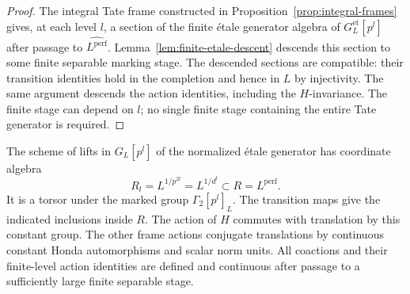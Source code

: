 \begin{proof}
The integral Tate frame constructed in
Proposition~\ref{prop:integral-frames} gives, at each level $l$,
a section of the finite étale generator algebra of
$G_L^{\mathrm{et}}[p^l]$ after passage to
$\widehat{L^{\mathrm{perf}}}$.
Lemma~\ref{lem:finite-etale-descent} descends this section to
some finite separable marking stage.  The descended sections
are compatible: their transition identities hold in the
completion and hence in $L$ by injectivity.  The same argument
descends the action identities, including the $H$-invariance.
The finite stage can depend on $l$; no single finite stage
containing the entire Tate generator is required.
\end{proof}

\begin{lemma}
\label{lem:lift-torsors}
The scheme of lifts in $G_L[p^l]$ of the normalized étale
generator has coordinate algebra
\begin{equation}
 R_l=L^{1/p^{2l}}=L^{1/d^l}\subset R=L^{\mathrm{perf}}.
 \label{eq:lift-rings}
\end{equation}
It is a torsor under the marked group $\Gamma_2[p^l]_L$.
The transition maps give the indicated inclusions inside $R$.
The action of $H$ commutes with translation by this constant
group.  The other frame actions conjugate translations by
continuous constant Honda automorphisms and scalar norm units.
All coactions and their finite-level action identities are
defined and continuous after passage to a sufficiently large
finite separable stage.
\end{lemma}


